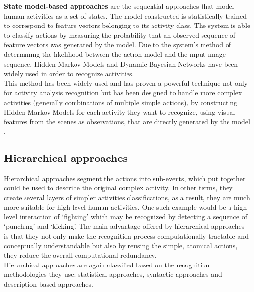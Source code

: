 \documentclass[11pt]{report}
\begin{document}
\textbf{State model-based approaches} are the sequential approaches that model human activities as a set of states. The model constructed is statistically trained to correspond to feature vectors belonging to its activity class. The system is able to classify actions by measuring the probability that an observed sequence of feature vectors was generated by the model. Due to the system's  method of determining the likelihood between the action model and the input image sequence, Hidden Markov Models and Dynamic Bayesian Networks have been widely used in order to recognize activities. \\

This method has been widely used and has proven a powerful technique not only for activity analysis recognition but has been designed to handle more complex activities (generally combinations of multiple simple actions), by constructing Hidden Markov Models for each activity they want to recognize, using visual features from the scenes as observations, that are directly generated by the model \cite{extended-HMM}. \\

\subsection{Hierarchical approaches}
Hierarchical approaches segment the actions into sub-events, which put together could be used to describe the original complex activity. In other terms, they create several layers of simpler activities classifications, as a result, they are much more suitable for high level human activities. One such example would be a high-level interaction of `fighting' which may be recognized by detecting a sequence of `punching' and `kicking'. The main advantage offered by hierarchical approaches is that they not only make the recognition process computationally tractable and conceptually understandable but also by reusing the simple, atomical actions, they reduce the overall computational redundancy. \\
Hierarchical approaches are again classified based on the recognition methodologies they use: statistical approaches, syntactic approaches and description-based approaches.\\
\end{document}
